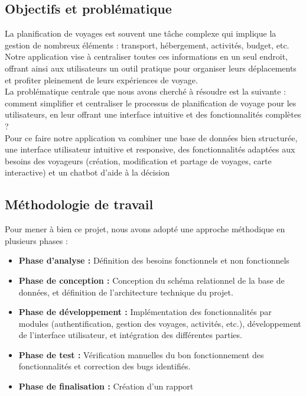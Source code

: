 \documentclass[a4paper,12pt]{article}
\begin{document}
\subsection{Objectifs et problématique}
La planification de voyages est souvent une tâche complexe qui implique la gestion de nombreux éléments : transport, hébergement, activités, budget, etc. Notre application vise à centraliser toutes ces informations en un seul endroit, offrant ainsi aux utilisateurs un outil pratique pour organiser leurs déplacements et profiter pleinement de leurs expériences de voyage.\\
La problématique centrale que nous avons cherché à résoudre est la suivante : comment simplifier et centraliser le processus de planification de voyage pour les utilisateurs, en leur offrant une interface intuitive et des fonctionnalités complètes ?\\
Pour ce faire notre application va combiner une base de données bien structurée, une interface utilisateur intuitive et responsive, des fonctionnalités adaptées aux besoins des voyageurs (création, modification et partage de voyages, carte interactive) et un chatbot d'aide à la décision 

\subsection{Méthodologie de travail}

Pour mener à bien ce projet, nous avons adopté une approche méthodique en plusieurs phases :

\begin{itemize}
  \item \textbf{Phase d'analyse :} Définition des besoins fonctionnels et non fonctionnels

  \item \textbf{Phase de conception :} Conception du schéma relationnel de la base de données, et définition de l'architecture technique du projet.

  \item \textbf{Phase de développement :} Implémentation des fonctionnalités par modules (authentification, gestion des voyages, activités, etc.), développement de l'interface utilisateur, et intégration des différentes parties.

  \item \textbf{Phase de test :} Vérification manuelles du bon fonctionnement des fonctionnalités et correction des bugs identifiés.

  \item \textbf{Phase de finalisation :} Création d'un rapport
\end{itemize}
\end{document}
